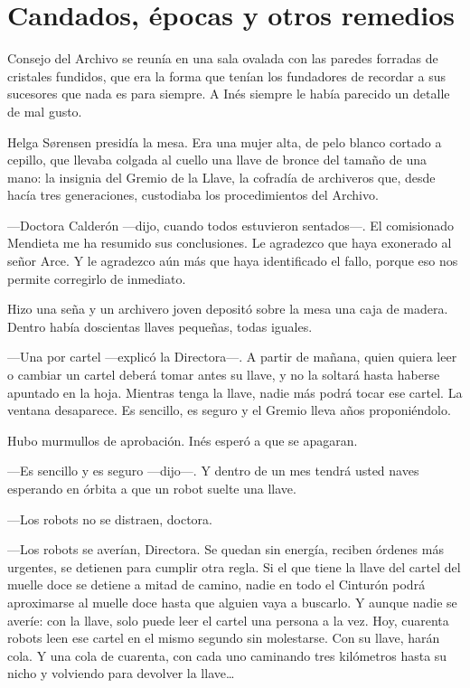 \chapter{Candados, épocas y otros remedios}

 Consejo del Archivo se reunía en una sala ovalada con las paredes forradas de cristales fundidos, que era la forma que tenían los fundadores de recordar a sus sucesores que nada es para siempre. A Inés siempre le había parecido un detalle de mal gusto.

Helga Sørensen presidía la mesa. Era una mujer alta, de pelo blanco cortado a cepillo, que llevaba colgada al cuello una llave de bronce del tamaño de una mano: la insignia del Gremio de la Llave, la cofradía de archiveros que, desde hacía tres generaciones, custodiaba los procedimientos del Archivo.

---Doctora Calderón ---dijo, cuando todos estuvieron sentados---\nobreak. El comisionado Mendieta me ha resumido sus conclusiones. Le agradezco que haya exonerado al señor Arce. Y le agradezco aún más que haya identificado el fallo, porque eso nos permite corregirlo de inmediato.

Hizo una seña y un archivero joven depositó sobre la mesa una caja de madera. Dentro había doscientas llaves pequeñas, todas iguales.

---Una por cartel ---explicó la Directora---\nobreak. A partir de mañana, quien quiera leer o cambiar un cartel deberá tomar antes su llave, y no la soltará hasta haberse apuntado en la hoja. Mientras tenga la llave, nadie más podrá tocar ese cartel. La ventana desaparece. Es sencillo, es seguro y el Gremio lleva años proponiéndolo.

Hubo murmullos de aprobación. Inés esperó a que se apagaran.

---Es sencillo y es seguro ---dijo---\nobreak. Y dentro de un mes tendrá usted naves esperando en órbita a que un robot suelte una llave.

---Los robots no se distraen, doctora.

---Los robots se averían, Directora. Se quedan sin energía, reciben órdenes más urgentes, se detienen para cumplir otra regla. Si el que tiene la llave del cartel del muelle doce se detiene a mitad de camino, nadie en todo el Cinturón podrá aproximarse al muelle doce hasta que alguien vaya a buscarlo. Y aunque nadie se averíe: con la llave, solo puede leer el cartel una persona a la vez. Hoy, cuarenta robots leen ese cartel en el mismo segundo sin molestarse. Con su llave, harán cola. Y una cola de cuarenta, con cada uno caminando tres kilómetros hasta su nicho y volviendo para devolver la llave\ldots

